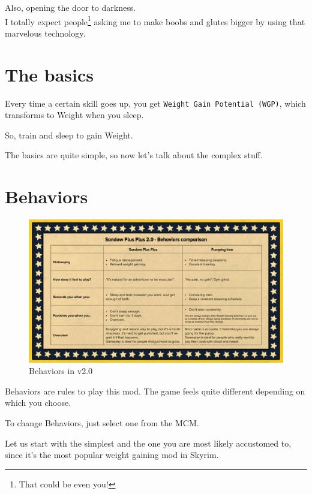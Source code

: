 \documentclass[11pt]{article}
\newcommand{\code}[1]{\small\texttt{#1}}
\newcommand{\w}{Weight}
\newcommand{\W}{WGP}
\newcommand{\Bs}{Behaviors}
\begin{document}
Also, opening the door to darkness.\\
I totally expect people\footnote{That could be even you!} asking me to make boobs and glutes bigger by using that marvelous technology.
\pagebreak

\section{The basics}
\begin{compactitem}
    \item  Every time a certain skill goes up, you get \code{Weight Gain Potential (\W)}, which transforms to \w{} when you sleep.
	\item So, train and sleep to gain \w.
\end{compactitem}

The basics are quite simple, so now let's talk about the complex stuff.

\section{\Bs}

\begin{figure}[h]
    \centering
    \includegraphics[width=\linewidth]{behavior-table}
    \caption{\Bs{} in v2.0}
    \label{fig:behavior-table}
\end{figure}

\Bs{} are rules to play this mod. The game feels quite different depending on which you choose.

To change \Bs, just select one from the MCM.

Let us start with the simplest and the one you are most likely accustomed to, since it's the most popular weight gaining mod in Skyrim.
\end{document}
